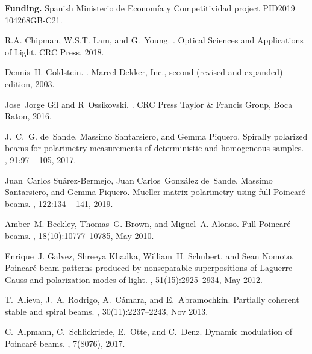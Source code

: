 \documentclass{article}
\begin{document}
\vspace{.5cm}

{\bf \large Funding.} Spanish Ministerio de Econom\'ia y Competitividad project PID2019 104268GB-C21.

\vspace{.5cm}




\begin{thebibliography}{10}
	
	R.A. Chipman, W.S.T. Lam, and G.~Young.
	.
	\newblock Optical Sciences and Applications of Light. CRC Press, 2018.
	
	Dennis~H. Goldstein.
	.
	\newblock Marcel Dekker, Inc., second (revised and expanded) edition, 2003.
	
	Jose~Jorge Gil and R~Ossikovski.
	.
	\newblock CRC Press Taylor {\&} Francis Group, Boca Raton, 2016.
	
	J.~C.~G. de~Sande, Massimo Santarsiero, and Gemma Piquero.
	\newblock Spirally polarized beams for polarimetry measurements of
	deterministic and homogeneous samples.
	, 91:97 -- 105, 2017.
	
	Juan~Carlos Su\'arez-Bermejo, Juan Carlos~Gonz\'alez de~Sande, Massimo
	Santarsiero, and Gemma Piquero.
	\newblock Mueller matrix polarimetry using full {Poincar\'{e}} beams.
	, 122:134 -- 141, 2019.
	
	Amber~M. Beckley, Thomas~G. Brown, and Miguel~A. Alonso.
	\newblock Full {Poincar\'{e}} beams.
	, 18(10):10777--10785, May 2010.
	
	Enrique~J. Galvez, Shreeya Khadka, William~H. Schubert, and Sean Nomoto.
	\newblock Poincar\'{e}-beam patterns produced by nonseparable superpositions of
	{Laguerre-Gauss} and polarization modes of light.
	, 51(15):2925--2934, May 2012.
	
	T.~Alieva, J.~A. Rodrigo, A.~C\'{a}mara, and E.~Abramochkin.
	\newblock Partially coherent stable and spiral beams.
	, 30(11):2237--2243, Nov 2013.
	
	C.~Alpmann, C.~Schlickriede, E.~Otte, and C.~Denz.
	\newblock Dynamic modulation of {Poincar\'e} beams.
	, 7(8076), 2017.
	

\end{thebibliography}
\end{document}
